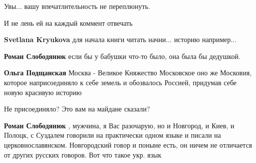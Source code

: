 \begin{itemize}
\begin{itemize}
Увы... вашу впечатлительность не переплюнуть.

 
И не лень ей на каждый коммент отвечать

 
\textbf{Svetlana Kryukova} для начала книги читать начни... историю например...

 
\textbf{Роман Слободянюк} если бы у бабушки что-то было, она была бы дедушкой.

 
\textbf{Ольга Подщанская} Москва - Великое Княжество Московское оно же Московия, которое наприсоединяло к себе земель и обозвалось Россией, придумав себе новую красивую историю

 
Не присоединяло? Это вам на майдане сказали?

 
\textbf{Роман Слободянюк} , мужчина, я Вас разочарую, но и Новгород, и Киев, и Полоцк, с Суздалем говорили на практически одном языке и писали на церковнославянском. Новгородский говор и поныне есть, он ничем не отличается от других русских говоров. Вот что такое укр. язык


\end{itemize}
\end{itemize}
